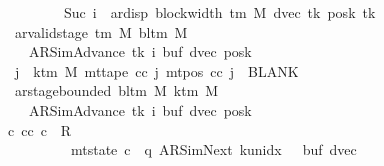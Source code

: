 \begin{isabellebody}
\ \ \ \ \ \ \ \ \ \ \ \ \ \ \ \ \ \ \ \ \ \ \ \ \ {\isasymand}\ Suc\ i\ {\isacharequal}{\kern0pt}\ ar{\isacharunderscore}{\kern0pt}disp\ {\isacharparenleft}{\kern0pt}block{\isacharunderscore}{\kern0pt}width\ {\isacharparenleft}{\kern0pt}{\isasymGamma}{\isacharunderscore}{\kern0pt}tm\ M{\isacharparenright}{\kern0pt}{\isacharparenright}{\kern0pt}\ {\isacharparenleft}{\kern0pt}dvec\ tk{\isacharparenright}{\kern0pt}\ {\isacharparenleft}{\kern0pt}posk\ tk{\isacharparenright}{\kern0pt}{\isacharparenright}{\kern0pt}{\isacharsemicolon}{\kern0pt}\isanewline
\ \ \ \ \ \ \ \ \ \ \ \ \ \ \ \ \ \ \ ar{\isacharunderscore}{\kern0pt}valid{\isacharunderscore}{\kern0pt}stage\ {\isacharparenleft}{\kern0pt}{\isasymGamma}{\isacharunderscore}{\kern0pt}tm\ M{\isacharparenright}{\kern0pt}\ {\isacharparenleft}{\kern0pt}bl{\isacharunderscore}{\kern0pt}tm\ M{\isacharparenright}{\kern0pt}\isanewline
\ \ \ \ \ \ \ \ \ \ \ \ \ \ \ \ \ \ \ \ \ {\isacharparenleft}{\kern0pt}AR{\isacharunderscore}{\kern0pt}SimAdvance{\isacharcomma}{\kern0pt}\ tk{\isacharcomma}{\kern0pt}\ i{\isacharcomma}{\kern0pt}\ buf{\isacharcomma}{\kern0pt}\ dvec{\isacharcomma}{\kern0pt}\ posk{\isacharparenright}{\kern0pt}{\isacharsemicolon}{\kern0pt}\isanewline
\ \ \ \ \ \ \ \ \ \ \ \ \ \ \ \ \ \ \ {\isasymforall}j\ {\isasymge}\ k{\isacharunderscore}{\kern0pt}tm\ M{\isachardot}{\kern0pt}\ mt{\isacharunderscore}{\kern0pt}tape\ cc\ j\ {\isacharparenleft}{\kern0pt}mt{\isacharunderscore}{\kern0pt}pos\ cc\ j{\isacharparenright}{\kern0pt}\ {\isacharequal}{\kern0pt}\ BLANK{}{\isacharsemicolon}{\kern0pt}\isanewline
\ \ \ \ \ \ \ \ \ \ \ \ \ \ \ \ \ \ \ ar{\isacharunderscore}{\kern0pt}stage{\isacharunderscore}{\kern0pt}bounded\ {\isacharparenleft}{\kern0pt}bl{\isacharunderscore}{\kern0pt}tm\ M{\isacharparenright}{\kern0pt}\ {\isacharparenleft}{\kern0pt}k{\isacharunderscore}{\kern0pt}tm\ M{\isacharparenright}{\kern0pt}\isanewline
\ \ \ \ \ \ \ \ \ \ \ \ \ \ \ \ \ \ \ \ \ {\isacharparenleft}{\kern0pt}AR{\isacharunderscore}{\kern0pt}SimAdvance{\isacharcomma}{\kern0pt}\ tk{\isacharcomma}{\kern0pt}\ i{\isacharcomma}{\kern0pt}\ buf{\isacharcomma}{\kern0pt}\ dvec{\isacharcomma}{\kern0pt}\ posk{\isacharparenright}{\kern0pt}\ {\isasymrbrakk}\isanewline
\ \ \ \ \ \ \ \ \ \ \ \ \ \ \ \ \ {\isasymLongrightarrow}\ {\isasymexists}c{\isacharprime}{\kern0pt}{\isacharprime}{\kern0pt}{\isachardot}{\kern0pt}\ {\isacharparenleft}{\kern0pt}cc{\isacharcomma}{\kern0pt}\ c{\isacharprime}{\kern0pt}{\isacharprime}{\kern0pt}{\isacharparenright}{\kern0pt}\ {\isasymin}\ R{\isacharprime}{\kern0pt}\isanewline
\ \ \ \ \ \ \ \ \ \ \ \ \ \ \ \ \ \ \ \ \ \ \ \ \ \ {\isasymand}\ mt{\isacharunderscore}{\kern0pt}state\ c{\isacharprime}{\kern0pt}{\isacharprime}{\kern0pt}\ {\isacharequal}{\kern0pt}\ {\isacharparenleft}{\kern0pt}q{\isacharcomma}{\kern0pt}\ AR{\isacharunderscore}{\kern0pt}SimNext{\isacharcomma}{\kern0pt}\ k{\isacharunderscore}{\kern0pt}unidx\ {}{\isacharcomma}{\kern0pt}\ {}{\isacharcomma}{\kern0pt}\ buf{\isacharcomma}{\kern0pt}\ dvec{\isacharcomma}{\kern0pt}\isanewline

\end{isabellebody}

